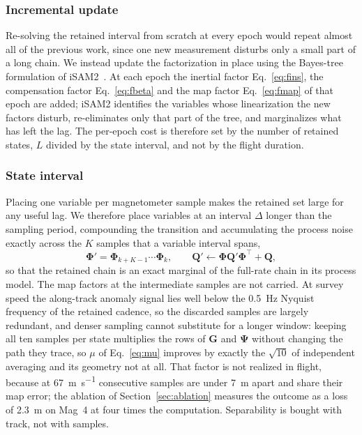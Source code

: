 \documentclass{IEEEtaes}
\begin{document}
\subsubsection{Incremental update}
Re-solving the retained interval from scratch at every epoch would repeat almost
all of the previous work, since one new measurement disturbs only a small part
of a long chain. We instead update the factorization in place using the
Bayes-tree formulation of iSAM2~\cite{kaess2012}. At each epoch the inertial
factor Eq.~\eqref{eq:fins}, the compensation factor Eq.~\eqref{eq:fbeta} and the map
factor Eq.~\eqref{eq:fmap} of that epoch are added; iSAM2 identifies the variables
whose linearization the new factors disturb, re-eliminates only that part of the
tree, and marginalizes what has left the lag. The per-epoch cost is therefore
set by the number of retained states, $L$ divided by the state interval, and not
by the flight duration.

\subsubsection{State interval}
Placing one variable per magnetometer sample makes the retained set large for
any useful lag. We therefore place variables at an interval $\Delta$ longer than
the sampling period, compounding the transition and accumulating the process
noise exactly across the $K$ samples that a variable interval spans,
\begin{equation}
\boldsymbol{\Phi}'=\boldsymbol{\Phi}_{k+K-1}\cdots\boldsymbol{\Phi}_{k},
\qquad
\mathbf{Q}'\leftarrow\boldsymbol{\Phi}\mathbf{Q}'\boldsymbol{\Phi}^{\top}+\mathbf{Q},
\label{eq:compound}
\end{equation}
so that the retained chain is an exact marginal of the full-rate chain in its
process model. The map factors at the intermediate samples are not carried.
At survey speed the along-track anomaly signal lies well below the
\SI{0.5}{\hertz} Nyquist frequency of the retained cadence, so the discarded
samples are largely redundant, and denser sampling cannot substitute for a
longer window: keeping all ten samples per state multiplies the rows of
$\mathbf{G}$ and $\boldsymbol{\Psi}$ without changing the path they trace, so
$\mu$ of Eq.~\eqref{eq:mu} improves by exactly the $\sqrt{10}$ of independent
averaging and its geometry not at all. That factor is not realized in flight,
because at \SI{67}{\meter\per\second} consecutive samples are under
\SI{7}{\meter} apart and share their map error; the ablation of
Section~\ref{sec:ablation} measures the outcome as a loss of
\SI{2.3}{\meter} on Mag~4 at four times the computation. Separability is
bought with track, not with samples.
\end{document}
